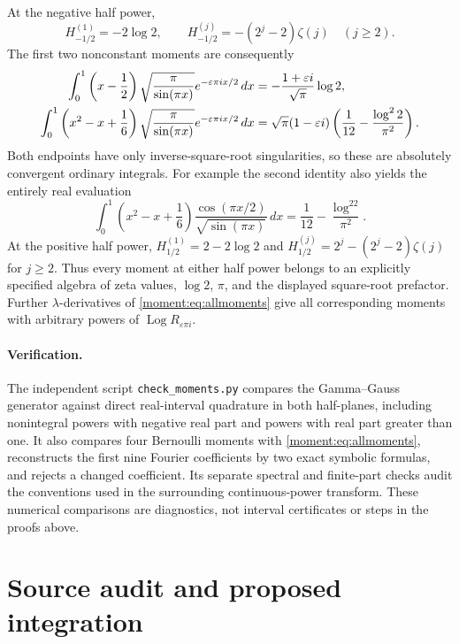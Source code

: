 \documentclass[11pt,a4paper]{article}
\numberwithin{equation}{section}
\theoremstyle{definition}
\theoremstyle{remark}
\begin{document}
At the negative half power,
\[
 H_{-1/2}^{(1)}=-2\log2,\qquad
 H_{-1/2}^{(j)}=-(2^j-2)\zeta(j)\quad(j\ge2).
\]
The first two nonconstant moments are consequently
\begin{align}\label{moment:eq:halfexamples}
 \int_0^1\left(x-\frac12\right)
  \sqrt{\frac\pi{\sin(\pi x)}}e^{-\varepsilon\pi i x/2}\,dx
 &=-\frac{1+\varepsilon i}{\sqrt\pi}\log2,\notag\\
 \int_0^1\left(x^2-x+\frac16\right)
  \sqrt{\frac\pi{\sin(\pi x)}}e^{-\varepsilon\pi i x/2}\,dx
 &=\sqrt\pi(1-\varepsilon i)
     \left(\frac1{12}-\frac{\log^22}{\pi^2}\right).
\end{align}
Both endpoints have only inverse-square-root singularities, so these
are absolutely convergent ordinary integrals. For example the second
identity also yields the entirely real evaluation
\begin{equation}\label{moment:eq:realhalf}
 \int_0^1\left(x^2-x+\frac16\right)
 \frac{\cos(\pi x/2)}{\sqrt{\sin(\pi x)}}\,dx
 =\frac1{12}-\frac{\log^22}{\pi^2}.
\end{equation}
At the positive half power,
$H_{1/2}^{(1)}=2-2\log2$ and
$H_{1/2}^{(j)}=2^j-(2^j-2)\zeta(j)$ for $j\ge2$.
Thus every moment at either half power belongs to an explicitly
specified algebra of zeta values, $\log2$, $\pi$, and the displayed
square-root prefactor. Further $\lambda$-derivatives of
\eqref{moment:eq:allmoments} give all corresponding moments with
arbitrary powers of $\operatorname{Log}R_{\varepsilon\pi i}$.

\paragraph{Verification.}
The independent script \texttt{check\_moments.py} compares the
Gamma--Gauss generator against direct real-interval quadrature in both
half-planes, including nonintegral powers with negative real part and
powers with real part greater than one. It also compares four Bernoulli
moments with \eqref{moment:eq:allmoments}, reconstructs the first nine
Fourier coefficients by two exact symbolic formulas, and rejects a
changed coefficient. Its separate spectral and finite-part checks audit
the conventions used in the surrounding continuous-power transform.
These numerical comparisons are diagnostics, not interval certificates
or steps in the proofs above.



\section{Source audit and proposed integration}
\label{audit:section}
\end{document}
